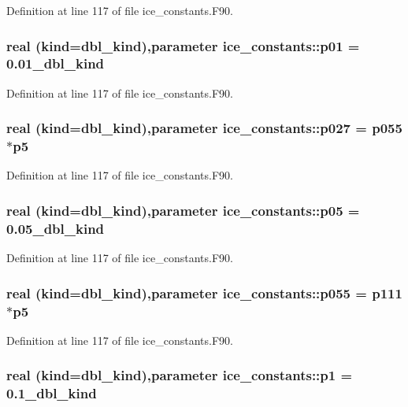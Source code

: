 Definition at line 117 of file ice\_\-constants.F90.\hypertarget{namespaceice__constants_a985c2a8f778734c09e77d0a0cdaaa190}{
\subsubsection[{p01}]{\setlength{\rightskip}{0pt plus 5cm}real (kind=dbl\_\-kind),parameter {\bf ice\_\-constants::p01} = 0.01\_\-dbl\_\-kind}}
\label{namespaceice__constants_a985c2a8f778734c09e77d0a0cdaaa190}


Definition at line 117 of file ice\_\-constants.F90.\hypertarget{namespaceice__constants_a6508f5f80299f19154df1721ee97fc85}{
\subsubsection[{p027}]{\setlength{\rightskip}{0pt plus 5cm}real (kind=dbl\_\-kind),parameter {\bf ice\_\-constants::p027} = {\bf p055}$\ast${\bf p5}}}
\label{namespaceice__constants_a6508f5f80299f19154df1721ee97fc85}


Definition at line 117 of file ice\_\-constants.F90.\hypertarget{namespaceice__constants_aec49f3df6ec3235c6304038e8fddbe00}{
\subsubsection[{p05}]{\setlength{\rightskip}{0pt plus 5cm}real (kind=dbl\_\-kind),parameter {\bf ice\_\-constants::p05} = 0.05\_\-dbl\_\-kind}}
\label{namespaceice__constants_aec49f3df6ec3235c6304038e8fddbe00}


Definition at line 117 of file ice\_\-constants.F90.\hypertarget{namespaceice__constants_aa715e54741a308eed3ebb5bfe30d82c2}{
\subsubsection[{p055}]{\setlength{\rightskip}{0pt plus 5cm}real (kind=dbl\_\-kind),parameter {\bf ice\_\-constants::p055} = {\bf p111}$\ast${\bf p5}}}
\label{namespaceice__constants_aa715e54741a308eed3ebb5bfe30d82c2}


Definition at line 117 of file ice\_\-constants.F90.\hypertarget{namespaceice__constants_a2defc12f4f68fac27d1f0b4848b9d77e}{
\subsubsection[{p1}]{\setlength{\rightskip}{0pt plus 5cm}real (kind=dbl\_\-kind),parameter {\bf ice\_\-constants::p1} = 0.1\_\-dbl\_\-kind}}
\label{namespaceice__constants_a2defc12f4f68fac27d1f0b4848b9d77e}


